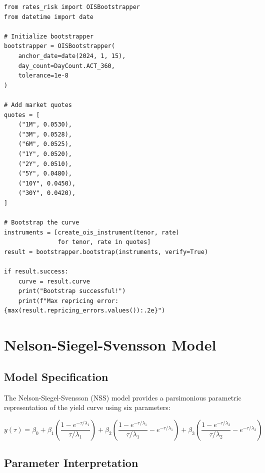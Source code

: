 \documentclass[12pt,a4paper]{report}
\begin{document}
\begin{lstlisting}
from rates_risk import OISBootstrapper
from datetime import date

# Initialize bootstrapper
bootstrapper = OISBootstrapper(
    anchor_date=date(2024, 1, 15),
    day_count=DayCount.ACT_360,
    tolerance=1e-8
)

# Add market quotes
quotes = [
    ("1M", 0.0530),
    ("3M", 0.0528),
    ("6M", 0.0525),
    ("1Y", 0.0520),
    ("2Y", 0.0510),
    ("5Y", 0.0480),
    ("10Y", 0.0450),
    ("30Y", 0.0420),
]

# Bootstrap the curve
instruments = [create_ois_instrument(tenor, rate) 
               for tenor, rate in quotes]
result = bootstrapper.bootstrap(instruments, verify=True)

if result.success:
    curve = result.curve
    print("Bootstrap successful!")
    print(f"Max repricing error: {max(result.repricing_errors.values()):.2e}")
\end{lstlisting}

\section{Nelson-Siegel-Svensson Model}

\subsection{Model Specification}

The Nelson-Siegel-Svensson (NSS) model provides a parsimonious parametric representation of the yield curve using six parameters:

\begin{equation}
    y(\tau) = \beta_0 + \beta_1 \left( \frac{1-e^{-\tau/\lambda_1}}{\tau/\lambda_1} \right) + \beta_2 \left( \frac{1-e^{-\tau/\lambda_1}}{\tau/\lambda_1} - e^{-\tau/\lambda_1} \right) + \beta_3 \left( \frac{1-e^{-\tau/\lambda_2}}{\tau/\lambda_2} - e^{-\tau/\lambda_2} \right)
\end{equation}

\subsection{Parameter Interpretation}
\end{document}
